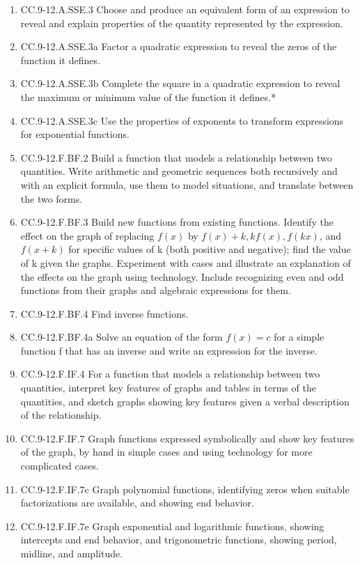 \documentclass{article}
\begin{document}
\begin{enumerate}
	\item CC.9-12.A.SSE.3 Choose and produce an equivalent form of an expression to reveal and explain properties of the quantity represented by the expression.
	\item CC.9-12.A.SSE.3a Factor a quadratic expression to reveal the zeros of the function it defines.
	\item CC.9-12.A.SSE.3b Complete the square in a quadratic expression to reveal the maximum or minimum value of the function it defines.*
	\item CC.9-12.A.SSE.3c Use the properties of exponents to transform expressions for exponential functions.
	\item CC.9-12.F.BF.2 Build a function that models a relationship between two quantities. Write arithmetic and geometric sequences both recursively and with an explicit formula, use them to model situations, and translate between the two forms.
	\item CC.9-12.F.BF.3 Build new functions from existing functions. Identify the effect on the graph of replacing $f(x)$ by $f(x) + k, k f(x), f(kx)$, and $f(x + k)$ for specific values of k (both positive and negative); find the value of k given the graphs. Experiment with cases and illustrate an explanation of the effects on the graph using technology. Include recognizing even and odd functions from their graphs and algebraic expressions for them.
	\item CC.9-12.F.BF.4  Find inverse functions. 
	\item CC.9-12.F.BF.4a Solve an equation of the form $f(x) = c$ for a simple function f that has an inverse and write an expression for the inverse. 
	\item CC.9-12.F.IF.4 For a function that models a relationship between two quantities, interpret key features of graphs and tables in terms of the quantities, and sketch graphs showing key features given a verbal description of the relationship. 
	\item CC.9-12.F.IF.7 Graph functions expressed symbolically and show key features of the graph, by hand in simple cases and using technology for more complicated cases.
	\item CC.9-12.F.IF.7c Graph polynomial functions, identifying zeros when suitable factorizations are available, and showing end behavior.
	\item CC.9-12.F.IF.7e Graph exponential and logarithmic functions, showing intercepts and end behavior, and trigonometric functions, showing period, midline, and amplitude.

\end{enumerate}
\end{document}
